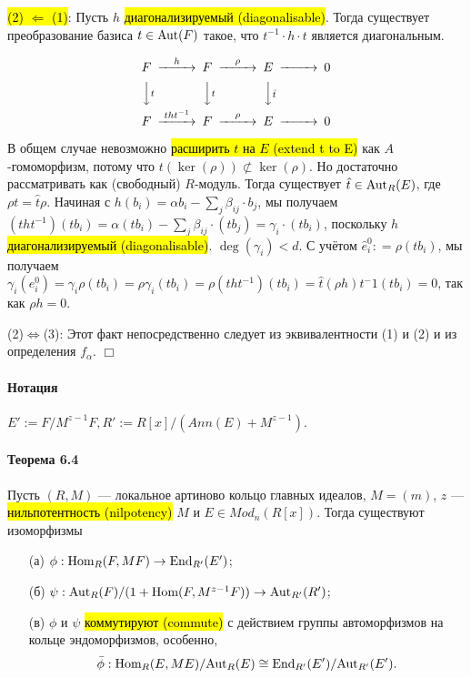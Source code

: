 \documentclass[a4paper,12pt]{article}
\newcommand{\hatei}[1]{\hat{e}_{#1}}
\newcommand{\Endom}{\text{End}}
\begin{document}
\hl{(2) $\Leftarrow$ (1)}: Пусть $h$ \hl{диагонализируемый (diagonalisable)}. Тогда существует преобразование базиса $t \in \text{Aut}(F)$ такое, что $t^{-1} \cdot h \cdot t$ является диагональным.

$$
\begin{CD}
	 F 	@>h>> 			F 		@>\rho>>	E	@>>> 0\\
	 @VVtV 				@VVtV			@VV\hat{t}V	\\
	 F 	@>tht^{-1}>>	F		@>\rho>>	E	@>>> 0
\end{CD}
$$

В общем случае невозможно \hl{расширить $t$ на $E$ (extend t to E)} как $A$-гомоморфизм, потому что $t(\ker(\rho)) \not \subset \ker(\rho)$. Но достаточно рассматривать как (свободный) $R$-модуль. Тогда существует $\hat{t} \in \text{Aut}_R (E)$, где $\rho t = \hat{t} \rho$. Начиная с $h(b_i) = \alpha b_i - \sum_j \beta_{ij} \cdot b_j$, мы получаем $(tht^{-1})(tb_i) = \alpha (tb_i) - \sum_j \beta_{ij} \cdot (tb_j) = \gamma_i \cdot (tb_i)$, поскольку $h$ \hl{диагонализируемый (diagonalisable)}. $\deg(\gamma_i) < d$. С учётом $\hatei{i}^0 : = \rho (t b_i)$, мы получаем $\gamma_i (e_i^0) = \gamma_i \rho (t b_i) = \rho \gamma_i (t b_i) = \rho (tht^{-1}) (t b_i) = \hat{t} (\rho h) t^-1 (t b_i) = 0$, так как $\rho h = 0$.

(2)$\Leftrightarrow$(3): Этот факт непосредственно следует из эквивалентности (1) и (2) и из определения $f_\alpha$. $\Box$

\paragraph{Нотация}
$E' := F/M^{z-1}F, R' := R[x]/ (Ann(E) + M^{z-1})$.

\paragraph{Теорема 6.4}
Пусть $(R, M)$ --- локальное артиново кольцо главных идеалов, $M = (m)$, $z$ --- \hl{нильпотентность (nilpotency)} $M$ и $E \in Mod_n (R[x])$. Тогда существуют изоморфизмы
\begin{itemize}
	\item[(а)] $\phi: \Hom_R(F, MF) \rightarrow \Endom_{R'}(E')$;
	\item[(б)] $\psi: \text{Aut}_R (F)/(1+\text{Hom}(F, M^{z-1}F)) \rightarrow \text{Aut}_{R'}(R')$;
	\item[(в)] $\phi$ и $\psi$ \hl{коммутируют (commute)} с действием группы автоморфизмов на кольце эндоморфизмов, особенно, $$\bar{\phi} : \Hom_R(E, ME)/ \Aut_R(E) \cong \Endom_{R'}(E') / \Aut_{R'}(E').$$
\end{itemize}
 
\end{document}
